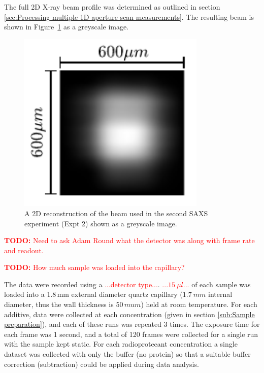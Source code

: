 The full 2D X-ray beam profile was determined as outlined in section \ref{sec:Processing multiple 1D aperture scan measurements}. The resulting beam is shown in Figure~\ref{fig:SAXS beam profile} as a greyscale image.
\begin{figure}
    \centering
    \includegraphics[width=0.8\textwidth]{figures/saxs/SAXS_beam.pdf}
    \caption{A 2D reconstruction of the beam used in the second SAXS experiment (Expt 2) shown as a greyscale image.}
    \label{fig:SAXS beam profile}
\end{figure}

\textcolor{red}{
    \begin{myenumerate}
        \item \hypertarget{todo:Detector type}{\textbf{TODO:} Need to ask Adam Round what the detector was along with frame rate and readout.}
        \item \hypertarget{todo:Detector type}{\textbf{TODO:} How much sample was loaded into the capillary?}
    \end{myenumerate}
}
The data were recorded using a \textcolor{red}{...detector type...}.
\textcolor{red}{...$15\ \mu l$...} of each sample was loaded into a 1.8$\,$mm external diameter quartz capillary ($1.7\ mm$ internal diameter, thus the wall thickness is 50$\,mu m$) held at room temperature.
For each additive, data were collected at each concentration (given in section \ref{sub:Sample preparation}), and each of these runs was repeated 3 times.
The exposure time for each frame was 1 second, and a total of 120 frames were collected for a single run with the sample kept static.
For each radioprotecant concentration a single dataset was collected with only the buffer (no protein) so that a suitable buffer correction (subtraction) could be applied during data analysis.

